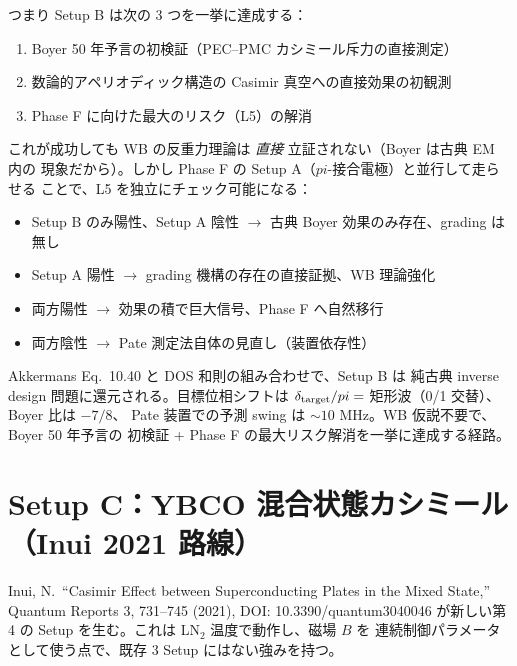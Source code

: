 \documentclass[11pt,a4paper]{article}
\def\pi{pi}%
\def\textbf#1{#1}%
\begin{document}
つまり Setup B は次の 3 つを一挙に達成する：
\begin{enumerate}
\item \textbf{Boyer 50 年予言の初検証}（PEC--PMC カシミール斥力の直接測定）
\item \textbf{数論的アペリオディック構造の Casimir 真空への直接効果の初観測}
\item \textbf{Phase F に向けた最大のリスク（L5）の解消}
\end{enumerate}

これが成功しても WB の反重力理論は \emph{直接} 立証されない（Boyer は古典 EM 内の
現象だから）。しかし \textbf{Phase F の Setup A（$\pi$-接合電極）と並行して走らせる
ことで、L5 を独立にチェック可能}になる：

\begin{itemize}
\item Setup B のみ陽性、Setup A 陰性 $\to$ 古典 Boyer 効果のみ存在、grading は無し
\item Setup A 陽性 $\to$ grading 機構の存在の直接証拠、WB 理論強化
\item 両方陽性 $\to$ 効果の積で巨大信号、Phase F へ自然移行
\item 両方陰性 $\to$ Pate 測定法自体の見直し（装置依存性）
\end{itemize}

\begin{tcolorbox}[colback=green!5,colframe=green!50!black,title=§7 の一行まとめ]
Akkermans Eq.\ 10.40 と DOS 和則の組み合わせで、Setup B は
\textbf{純古典 inverse design 問題}に還元される。目標位相シフトは
$\delta_{\rm target}/\pi = $ 矩形波（0/1 交替）、Boyer 比は $-7/8$、
Pate 装置での予測 swing は $\sim 10$ MHz。WB 仮説不要で、Boyer 50 年予言の
初検証 + Phase F の最大リスク解消を一挙に達成する経路。
\end{tcolorbox}

\section{Setup C：YBCO 混合状態カシミール（Inui 2021 路線）}

\textbf{Inui, N.\ ``Casimir Effect between Superconducting Plates in the Mixed State,''
Quantum Reports \textbf{3}, 731--745 (2021), DOI: 10.3390/quantum3040046}
が新しい第 4 の Setup を生む。これは LN$_2$ 温度で動作し、磁場 $B$ を
連続制御パラメータとして使う点で、既存 3 Setup にはない強みを持つ。
\end{document}
